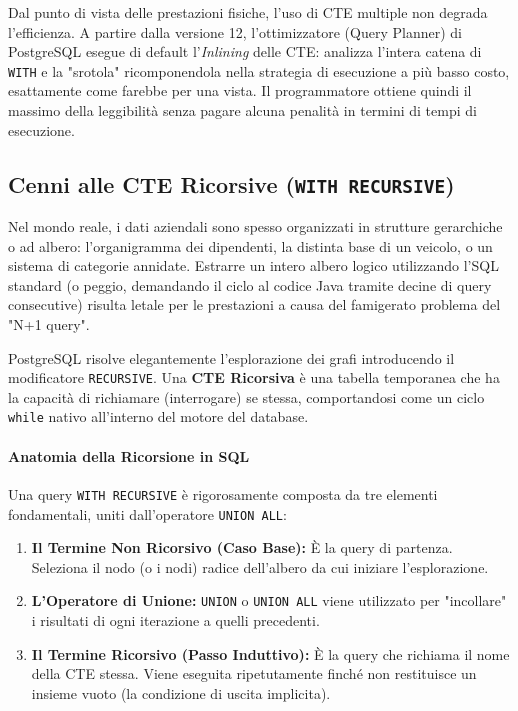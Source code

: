 \begin{dettagli}
Dal punto di vista delle prestazioni fisiche, l'uso di CTE multiple non degrada l'efficienza. A partire dalla versione 12, l'ottimizzatore (Query Planner) di PostgreSQL esegue di default l'\textit{Inlining} delle CTE: analizza l'intera catena di \texttt{WITH} e la "srotola" ricomponendola nella strategia di esecuzione a più basso costo, esattamente come farebbe per una vista. Il programmatore ottiene quindi il massimo della leggibilità senza pagare alcuna penalità in termini di tempi di esecuzione.
\end{dettagli}

\subsection{Cenni alle CTE Ricorsive (\texttt{WITH RECURSIVE})}

Nel mondo reale, i dati aziendali sono spesso organizzati in strutture gerarchiche o ad albero: l'organigramma dei dipendenti, la distinta base di un veicolo, o un sistema di categorie annidate. Estrarre un intero albero logico utilizzando l'SQL standard (o peggio, demandando il ciclo al codice Java tramite decine di query consecutive) risulta letale per le prestazioni a causa del famigerato problema del "N+1 query".

PostgreSQL risolve elegantemente l'esplorazione dei grafi introducendo il modificatore \texttt{RECURSIVE}. Una \textbf{CTE Ricorsiva} è una tabella temporanea che ha la capacità di richiamare (interrogare) se stessa, comportandosi come un ciclo \texttt{while} nativo all'interno del motore del database.

\paragraph{Anatomia della Ricorsione in SQL}
Una query \texttt{WITH RECURSIVE} è rigorosamente composta da tre elementi fondamentali, uniti dall'operatore \texttt{UNION ALL}:
\begin{enumerate}
    \item \textbf{Il Termine Non Ricorsivo (Caso Base):} È la query di partenza. Seleziona il nodo (o i nodi) radice dell'albero da cui iniziare l'esplorazione.
    \item \textbf{L'Operatore di Unione:} \texttt{UNION} o \texttt{UNION ALL} viene utilizzato per "incollare" i risultati di ogni iterazione a quelli precedenti.
    \item \textbf{Il Termine Ricorsivo (Passo Induttivo):} È la query che richiama il nome della CTE stessa. Viene eseguita ripetutamente finché non restituisce un insieme vuoto (la condizione di uscita implicita).
\end{enumerate}

